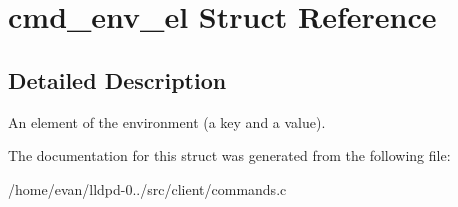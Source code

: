 \section{cmd\-\_\-env\-\_\-el \-Struct \-Reference}
\label{structcmd__env__el}


\subsection{\-Detailed \-Description}
\-An element of the environment (a key and a value). 

\-The documentation for this struct was generated from the following file\-:\begin{DoxyCompactItemize}
\item 
/home/evan/lldpd-\/0../src/client/commands.\-c\end{DoxyCompactItemize}
